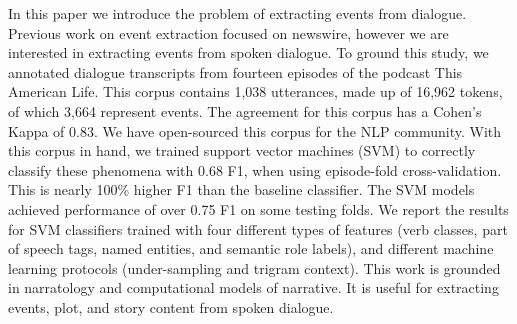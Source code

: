 In this paper we introduce the problem of extracting events from dialogue. Previous work on event extraction focused on newswire, however we are interested in extracting events from spoken dialogue.  To ground this study, we annotated dialogue transcripts from fourteen episodes of the podcast This American Life. This corpus contains 1,038 utterances, made up of 16,962 tokens, of which 3,664 represent events. The agreement for this corpus has a Cohen's Kappa of 0.83. We have open-sourced this corpus for the NLP community. With this corpus in hand, we trained support vector machines (SVM) to correctly classify these phenomena with 0.68 F1, when using episode-fold cross-validation. This is nearly 100\% higher F1 than the baseline classifier. The SVM models achieved performance of over 0.75 F1 on some testing folds. We report the results for SVM classifiers trained with four different types of features (verb classes, part of speech tags, named entities, and semantic role labels), and different machine learning protocols (under-sampling and trigram context). This work is grounded in narratology and computational models of narrative. It is useful for extracting events, plot, and story content from spoken dialogue.
